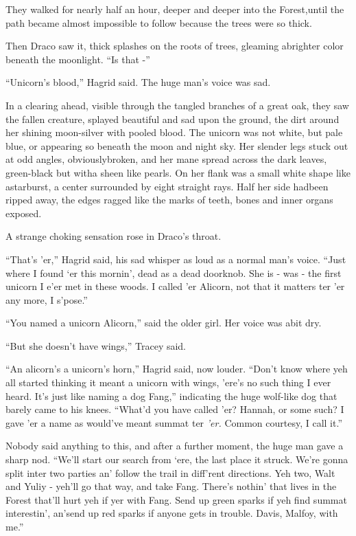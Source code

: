 They walked for nearly half an hour, deeper and deeper into the Forest,until the path became almost impossible to follow because the trees were so thick.

Then Draco saw it, thick splashes on the roots of trees, gleaming abrighter color beneath the moonlight. ``Is that -''

``Unicorn's blood,'' Hagrid said. The huge man's voice was sad.

In a clearing ahead, visible through the tangled branches of a great oak, they saw the fallen creature, splayed beautiful and sad upon the ground, the dirt around her shining moon-silver with pooled blood. The unicorn was not white, but pale blue, or appearing so beneath the moon and night sky. Her slender legs stuck out at odd angles, obviouslybroken, and her mane spread across the dark leaves, green-black but witha sheen like pearls. On her flank was a small white shape like astarburst, a center surrounded by eight straight rays. Half her side hadbeen ripped away, the edges ragged like the marks of teeth, bones and inner organs exposed.

A strange choking sensation rose in Draco's throat.

``That's 'er,'' Hagrid said, his sad whisper as loud as a normal man's voice. ``Just where I found `er this mornin', dead as a dead doorknob. She is - was - the first unicorn I e'er met in these woods. I called 'er Alicorn, not that it matters ter 'er any more, I s'pose.''

``You named a unicorn Alicorn,'' said the older girl. Her voice was abit dry.

``But she doesn't have wings,'' Tracey said.

``An alicorn's a unicorn's horn,'' Hagrid said, now louder. ``Don't know where yeh all started thinking it meant a unicorn with wings, 'ere's no such thing I ever heard. It's just like naming a dog Fang,'' indicating the huge wolf-like dog that barely came to his knees. ``What'd you have called 'er? Hannah, or some such? I gave 'er a name as would've meant summat ter \emph{'er.} Common courtesy, I call it.''

Nobody said anything to this, and after a further moment, the huge man gave a sharp nod. ``We'll start our search from `ere, the last place it struck. We're gonna split inter two parties an' follow the trail in diff'rent directions. Yeh two, Walt and Yuliy - yeh'll go that way, and take Fang. There's nothin' that lives in the Forest that'll hurt yeh if yer with Fang. Send up green sparks if yeh find summat interestin', an'send up red sparks if anyone gets in trouble. Davis, Malfoy, with me.''

